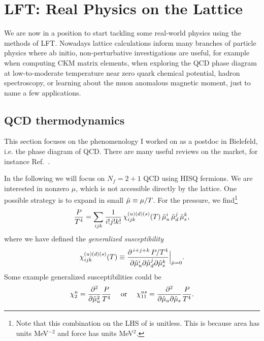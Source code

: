 \chapter{LFT: Real Physics on the Lattice}\label{ch:realPhys}

We are now in a position to start tackling some real-world physics using the
methods of LFT. Nowadays lattice calculations inform many branches of particle
physics where ab initio, non-perturbative investigations are useful, for example
when computing CKM matrix elements, when exploring the QCD phase diagram at
low-to-moderate temperature near zero quark chemical potential, hadron
spectroscopy, or learning about the muon anomalous magnetic moment, just to name
a few applications.

\section{QCD thermodynamics}\label{sec:QCDtherm} 

This section focuses on the phenomenology I worked on as a postdoc in
Bielefeld, i.e. the phase diagram of QCD. There are many useful reviews
on the market, for instance Ref.~\cite{ding_thermodynamics_2015}.

In the following we will focus on $N_f=2+1$ QCD using HISQ fermions. We are
interested in nonzero $\mu$, which is not accessible directly by the lattice.
One possible strategy is to expand in small $\hat{\mu}\equiv\mu/T$. For the
pressure, we find\footnote{Note that this combination on the LHS of 
 is unitless. This is because area has units
MeV$^{-2}$ and force has units MeV$^2$.}
\begin{equation}\label{eq:pxpac}
\frac{P}{T^4}=\sum_{ijk}\frac{1}{i!j!k!}\,\chi_{ijk}^{(u)(d)(s)}(T)\,
               \hat{\mu}_u^i\,\hat{\mu}_d^j\,\hat{\mu}_s^k,
\end{equation}
where we have defined the {\it generalized
susceptibility}
\begin{equation}
\chi_{ijk}^{(u)(d)(s)}(T)
  \equiv\frac{\partial^{\,i+j+k}\,P/T^4}{\partial\hat{\mu}_u^i\partial\hat{\mu}_d^j
                                       \partial\hat{\mu}_s^k}\Big|_{\hat{\mu}=0}.
\end{equation}
Some example generalized susceptibilities could be
\begin{equation}
  \chi_2^u=\frac{\partial^2}{\partial\hat{\mu}_u^2}\frac{P}{T^4}
  ~~~~\text{or}~~~~
  \chi_{11}^{us}=\frac{\partial^2}{\partial\hat{\mu}_u\partial\hat{\mu}_s}\frac{P}{T^4}.
\end{equation}

